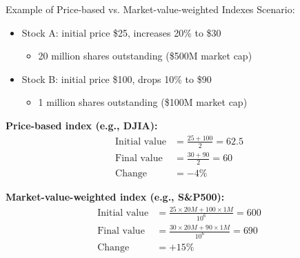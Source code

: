 \documentclass[10pt]{beamer}
\begin{document}
\begin{frame}{Example of Price-based vs. Market-value-weighted Indexes}
  Scenario:
  \begin{itemize}
    \item Stock A: initial price \$25, increases 20\% to \$30
      \begin{itemize}
        \item 20 million shares outstanding (\$500M market cap)
      \end{itemize}
    \item Stock B: initial price \$100, drops 10\% to \$90
      \begin{itemize}
        \item 1 million shares outstanding (\$100M market cap)
      \end{itemize}
  \end{itemize}
  
  \pause
  \textbf{Price-based index (e.g., DJIA):}
  \begin{align*}
    \text{Initial value} &= \tfrac{25 + 100}{2} = 62.5\\
    \text{Final value} &= \tfrac{30 + 90}{2} = 60\\
    \text{Change} &= -4\%
  \end{align*}
  
  \pause
  \textbf{Market-value-weighted index (e.g., S\&P500):}
  \begin{align*}
    \text{Initial value} &= \tfrac{25 \times 20M + 100 \times 1M}{10^6} = 600\\
    \text{Final value} &= \tfrac{30 \times 20M + 90 \times 1M}{10^6} = 690\\
    \text{Change} &= +15\%
  \end{align*}
\end{frame}
\end{document}
